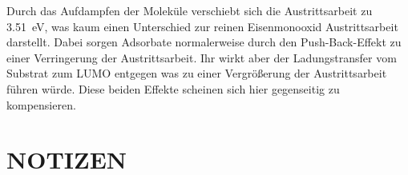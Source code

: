         Durch das Aufdampfen der Moleküle verschiebt sich die Austrittsarbeit zu \SI{3.51}{\electronvolt}, was kaum einen Unterschied zur reinen Eisenmonooxid Austrittsarbeit darstellt.
        Dabei sorgen Adsorbate normalerweise durch den Push-Back-Effekt zu einer Verringerung der Austrittsarbeit.
        Ihr wirkt aber der Ladungstransfer vom Substrat zum LUMO entgegen was zu einer Vergrößerung der Austrittsarbeit führen würde.
        Diese beiden Effekte scheinen sich hier gegenseitig zu kompensieren.

  
    \section{NOTIZEN}

